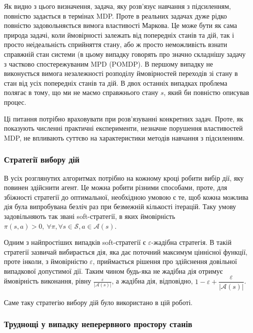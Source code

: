 \documentclass[a4paper,10pt,fleqn,draft]{article}
\begin{document}
Як видно з цього визначення, задача, яку розв'язує навчання з підсиленням, повністю задається в термінах MDP. Проте в реальних задачах дуже рідко повністю задовольняється вимога властивості Маркова. Це може бути як сама природа задачі, коли ймовірності залежать від попередніх станів та дій, так і просто неідеальність сприйняття стану, або ж просто неможливість взнати справжній стан системи (в цьому випадку говорять про значно складнішу задачу з частково спостережуваним MPD (POMDP). В першому випадку не виконується вимога незалежності розподілу ймовірностей переходів зі стану в стан від усіх попередніх станів та дій. В двох останніх випадках проблема полягає в тому, що ми не маємо справжнього стану $s$, який би повністю описував процес.

Ці питання потрібно враховувати при розв'язуванні конкретних задач. Проте, як показують численні практичні експерименти, незначне порушення властивостей MDP, не впливають суттєво на характеристики методів навчання з підсиленням.

\subsubsection{Стратегії вибору дій}
В усіх розглянутих алгоритмах потрібно на кожному кроці робити вибір дії, яку повинен здійснити агент. Це можна робити різними способами, проте, для збіжності стратегії до оптимальної, необхідною умовою є те, щоб кожна можлива дія була випробувана безліч раз при безмежній кількості ітерацій. Таку умову задовільняють так звані soft-стратегії, в яких ймовірність $\pi(s,a)>0,\ \forall \pi, \forall s \in \mathcal{S}, a \in \mathcal{A}(s)$.

Одним з найпростіших випадків soft-стратегії є $\varepsilon$-жадібна стратегія. В такій стратегії зазвичай вибирається дія, яка дає поточний максимум ціннісної функції, проте інколи, з ймовірністю $\varepsilon$, приймається рішення про здійснення довільної випадкової допустимої дії. Таким чином будь-яка не жадібна дія отримує ймовірність виконання, рівну $\frac{\varepsilon}{|\mathcal{A}(s)|}$, а жадібна дія, відповідно, $ 1 - \varepsilon + \dfrac{\varepsilon}{|\mathcal{A}(s)|}$.

Саме таку стратегію вибору дій було використано в цій роботі.

\subsubsection{Труднощі у випадку неперервного простору станів}
\end{document}
